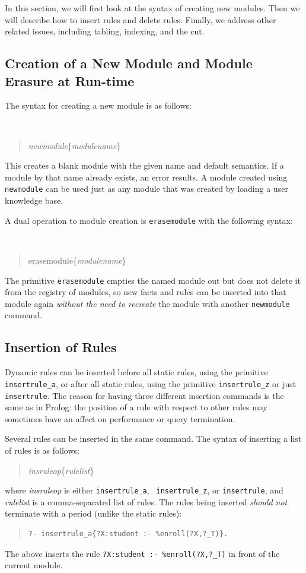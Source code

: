 \documentclass[11pt]{article}
\begin{document}
In this section, we will first look at the syntax of creating new
modules.  Then we will describe how to insert rules and delete
rules. Finally, we address other related issues, including tabling,
indexing, and the cut.


\subsection{Creation of a New Module and Module Erasure at Run-time}


The syntax for creating a new module is as follows:
{\tt
\begin{quote}
\emph{newmodule}\{\emph{modulename}\}
\end{quote}
}
\noindent
This creates a blank module with the given name and default semantics.  If
a module by that name already exists, an error results.  A module created
using {\tt newmodule} can be used just as any module that
was created by loading a user knowledge base.

A dual operation to module creation
is \texttt{erasemodule} with the following syntax:
{\tt
\begin{quote}
erasemodule\{\emph{modulename}\}
\end{quote}
}
The primitive \texttt{erasemodule} empties the named module out but does not delete
it from the registry of modules, so new facts and rules can be inserted
into that module again \emph{without the need to recreate} the module with
another \texttt{newmodule} command. 




\subsection{Insertion of Rules}
\label{sec-insertingrule}

Dynamic rules can be inserted before all static rules, using the
primitive {\tt insertrule\_a}, or after all static rules, using the
primitive {\tt insertrule\_z} or just {\tt insertrule}.
The reason for having three different insertion commands is the same as in
Prolog: the position of a rule with respect to other rules
may sometimes have an affect on
performance or query termination.

Several rules
can be inserted in the same command. The syntax of inserting a list of
rules is as follows:
\begin{quote}
\emph{insruleop}\{\emph{rulelist}\}
\end{quote}
\noindent
where \emph{insruleop} is either {\tt insertrule\_a}, {\tt
  insertrule\_z}, or {\tt insertrule},  and \emph{rulelist}  is a comma-separated
  list of rules.  The rules being inserted \emph{should not} terminate
  with a period (unlike the static rules):
\begin{quote}
\begin{verbatim}
?- insertrule_a{?X:student :- %enroll(?X,?_T)}.
\end{verbatim}
\end{quote}
The above inserts the rule {\tt ?X:student :- \verb|%|enroll(?X,?\_T)} in
front of the current module.
\end{document}
